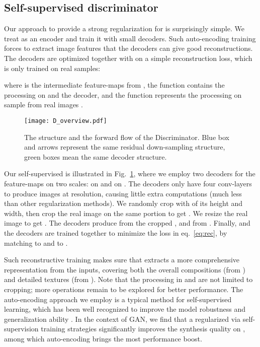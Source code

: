 \documentclass{article} \usepackage{iclr2021_conference,times}
\begin{document}
\subsection{Self-supervised discriminator}
Our approach to provide a strong regularization for  is surprisingly simple. We treat  as an encoder and train it with small decoders. Such auto-encoding training forces  to extract image features that the decoders can give good reconstructions. The decoders are optimized together with  on a simple reconstruction loss, which is only trained on real samples:


where  is the intermediate feature-maps from , the function  contains the processing on  and the decoder, and the function  represents the processing on sample  from real images .

\begin{figure}[h]
\begin{center}
\texttt{[image: D\_overview.pdf]}
\end{center}
\caption{The structure and the forward flow of the Discriminator. Blue box and arrows represent the same residual down-sampling structure, green boxes mean the same decoder structure.}
\label{fig:d_overview}
\end{figure}


Our self-supervised  is illustrated in Fig.~\ref{fig:d_overview}, where we employ two decoders for the feature-maps on two scales:  on  and  on  . The decoders only have four conv-layers to produce images at  resolution, causing little extra computations (much less than other regularization methods). We randomly crop  with  of its height and width, then crop the real image on the same portion to get . We resize the real image to get . The decoders produce  from the cropped , and  from . Finally,  and the decoders are trained together to minimize the loss in eq.~\ref{eq:rec}, by matching  to  and  to .

Such reconstructive training makes sure that  extracts a more comprehensive representation from the inputs, covering both the overall compositions (from ) and detailed textures (from ). Note that the processing in  and  are not limited to cropping; more operations remain to be explored for better performance. The auto-encoding approach we employ is a typical method for self-supervised learning, which has been well recognized to improve the model robustness and generalization ability \citep{he2020momentum,hendrycks2019using,jing2020self,goyal2019scaling}. In the context of GAN, we find that a regularized  via self-supervision training strategies significantly improves the synthesis quality on , among which auto-encoding brings the most performance boost.
\end{document}
